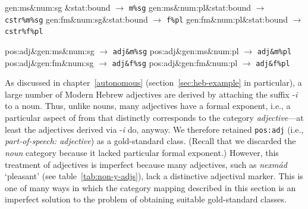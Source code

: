 {\begin{description}
\begin{exe}
\ex  
\begin{xlist}
		\ex gen:ms\&num:sg \&stat:bound \quad $\to$ \quad \texttt{m\%sg} \label{ex:cstr:m-sg}
		\ex gen:ms\&num:pl\&stat:bound \quad $\to$ \quad \texttt{cstr\%m\%sg} \label{ex:cstr:m-pl}
		\ex gen:fm\&num:sg\&stat:bound  \quad $\to$ \quad \texttt{f\%pl} \label{ex:cstr:f-sg}
		\ex gen:fm\&num:pl\&stat:bound \quad $\to$ \quad \texttt{cstr\%f\%pl} \label{ex:cstr:f-pl}
	\end{xlist} \label{ex:cstr-cats}
\ex  
\begin{xlist}
		\ex pos:adj\&gen:ms\&num:sg \quad $\to$ \quad \texttt{adj\&m\%sg} \label{ex:adj:m-sg}
		\ex pos:adj\&gen:ms\&num:pl \quad $\to$ \quad \texttt{adj\&m\%pl} \label{ex:adj:m-pl}
		\ex pos:adj\&gen:fm\&num:sg \quad $\to$ \quad \texttt{adj\&f\%sg} \label{ex:adj:f-sg}
		\ex pos:adj\&gen:fm\&num:pl \quad $\to$ \quad \texttt{adj\&f\%pl} \label{ex:adj:f-pl}
	\end{xlist} \label{ex:adj-cats}
\end{exe}

\item[Adjectives.]
As discussed in chapter~\ref{autonomous} (section~\ref{sec:heb-example} in particular), 
a large number of Modern Hebrew adjectives are derived by attaching the 
suffix -\textit{i}
to a noun. Thus, unlike nouns, many adjectives have a formal exponent, i.e., a particular aspect of from that distinctly corresponds to the category \emph{adjective}---at least the adjectives derived via -\textit{i} do, anyway. 
We therefore retained
\texttt{pos:adj} (i.e., \textit{part-of-speech: adjective}) as a gold-standard class.
(Recall that we discarded the \emph{noun} category because it lacked particular formal exponent.) 
However, this treatment of adjectives is imperfect because many adjectives, such as
\textit{nexm\'{a}d} `pleasant' (see table~\ref{tab:non-y-adjs}),
lack a distinctive adjectival marker.  This is one of many ways in which the category mapping described in this section is an imperfect solution to the problem of obtaining suitable gold-standard classes.  
 

\end{description}}
